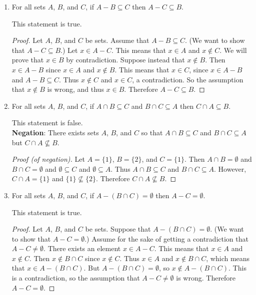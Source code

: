 \documentclass[11pt]{article}
\begin{document}
\begin{enumerate}
\item For all sets $A$, $B$, and $C$, if $A-B\subseteq C$ then $A-C\subseteq B$.
\begin{Solution}This statement is true.
      \begin{proof}
       Let $A$, $B$, and $C$ be sets. Assume that $A-B\subseteq C$. (We want to show that $A-C\subseteq B$.) Let $x\in A-C$. This means that $x\in A$ and $x\notin C$. We will prove that $x\in B$ by contradiction. Suppose instead that $x\notin B$. Then $x\in A-B$ since $x\in A$ and $x\not\in B$. This means that $x\in C$, since $x\in A-B$ and $A-B\subseteq C$. Thus $x\notin C$ and $x\in C$, a contradiction. So the assumption that $x\notin B$ is wrong, and thus $x\in B$. Therefore  $A-C\subseteq B$.
      \end{proof}
\end{Solution}

\item For all sets $A$, $B$, and $C$, if $A\cap B\subseteq C$ and $B\cap C\subseteq A$ then $C\cap A\subseteq B$.
\begin{Solution}This statement is false.\\
      \textbf{Negation}: There exists sets $A$, $B$, and $C$ so that $A\cap B\subseteq C$ and $B\cap C\subseteq A$ but $C\cap A\not\subseteq B$.
      \begin{proof}[Proof \textup{(}of negation\textup{)}]
       Let $A=\{1\}$, $B=\{2\}$, and $C=\{1\}$. Then $A\cap B=\emptyset$ and $B\cap C=\emptyset$ and $\emptyset\subseteq C$ and $\emptyset\subseteq A$. Thus $A\cap B\subseteq C$ and $B\cap C\subseteq A$. However, $C\cap A=\{1\}$ and $\{1\}\not\subseteq \{2\}$. Therefore $C\cap A\not\subseteq B$.
      \end{proof}
\end{Solution}

\item For all sets $A$, $B$, and $C$, if $A-(B\cap C)=\emptyset$ then $A-C=\emptyset$.
\begin{Solution}This statement is true.
      \begin{proof}
       Let $A$, $B$, and $C$ be sets. Suppose that $A-(B\cap C)=\emptyset$. (We want to show that $A-C=\emptyset$.) Assume for the sake of getting a contradiction that $A-C\neq\emptyset$. There exists an element $x\in A-C$. This means that $x\in A$ and $x\not\in C$. Then $x\not\in B\cap C$ since $x\not\in C$. Thus $x\in A$ and $x\not\in B\cap C$, which means that $x\in A-(B\cap C)$. But $A-(B\cap C)=\emptyset$, so $x\not\in A-(B\cap C)$. This is a contradiction, so the assumption that $A-C\neq\emptyset$ is wrong. Therefore $A-C=\emptyset$.
      \end{proof}


\end{Solution}
\end{enumerate}
\end{document}
